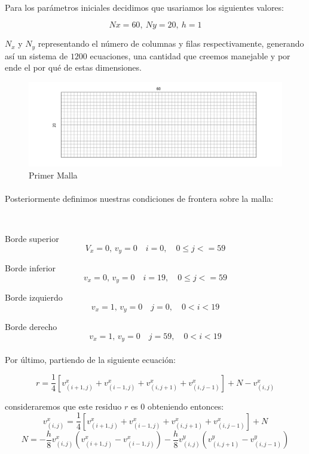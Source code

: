 \documentclass{article}
\begin{document}
  \paragraph{}
  Para los parámetros iniciales decidimos que usariamos los siguientes valores:

  \[Nx=60, \ Ny=20, \ h=1\]

  $N_x$ y $N_y$ representando el número de columnas y filas respectivamente, generando así un sistema de $1200$ ecuaciones, una cantidad que creemos manejable y por ende el por qué de estas dimensiones.

  \begin{figure}[h!]
    \centering
    \includegraphics[width=1\textwidth]{PrimerMalla.png}
    \caption{Primer Malla}
  \end{figure}

  \paragraph{}
  Posteriormente definimos nuestras condiciones de frontera sobre la malla:

  \

  Borde superior
  \[V_x = 0, \, v_y = 0 \quad i = 0, \quad 0 \leq j <= 59\]

  Borde inferior
  \[v_x = 0, \, v_y = 0 \quad i = 19, \quad 0 \leq j <= 59\]

  Borde izquierdo
  \[v_x = 1, \, v_y = 0 \quad j = 0, \quad 0 < i < 19\]

  Borde derecho
  \[v_x = 1, \, v_y = 0 \quad j = 59, \quad 0 < i < 19\]

  \paragraph{}
  Por último, partiendo de la siguiente ecuación:

  \[r=\frac{1}{4}[v_{(i+1,j)}^x+v_{(i-1,j)}^x+v_{(i,j+1)}^x+v_{(i,j-1)}^x]+N-v_{(i,j)}^x\]
  
  consideraremos que este residuo $r$ es $0$ obteniendo entonces:
  \[v_{(i,j)}^x=\frac{1}{4}[v_{(i+1,j)}^x+v_{(i-1,j)}^x+v_{(i,j+1)}^x+v_{(i,j-1)}^x]+N\]
  \[N=-\frac{h}{8}v_{(i,j)}^x(v_{(i+1,j)}^x-v_{(i-1,j)}^x)-\frac{h}{8}v_{(i,j)}^y(v_{(i,j+1)}^y-v_{(i,j-1)}^y)\]
\end{document}
